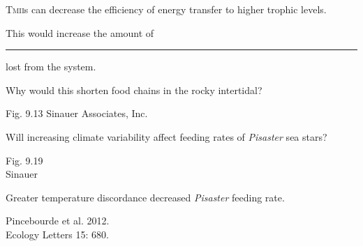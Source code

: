 \documentclass[t]{beamer}
\begin{document}
%
{
\begin{frame}[t]{\textsc{Tmii}s can decrease the efficiency of energy transfer to higher trophic levels.}

	\vspace*{2\baselineskip}

	\hspace*{75mm}\parbox{45mm}{\raggedright This would increase the amount of \rule{1.5cm}{0.4pt} lost from the system.}

	\vspace*{2\baselineskip}
	
	\hspace*{75mm}\parbox{45mm}{\raggedright Why would this shorten food chains in the rocky intertidal?}

	\vfilll
	
	\hfill \tiny Fig. 9.13 \textcopyright Sinauer Associates, Inc.
\end{frame}
}
%
{
\begin{frame}[b]{Will increasing climate variability affect feeding rates of \textit{Pisaster} sea stars?}

\hfill \tiny Fig. 9.19\\\hfill\textcopyright Sinauer
\end{frame}
}

%
{
\begin{frame}[b]{Greater temperature discordance decreased \textit{Pisaster} feeding rate.}

\tiny Pincebourde et al. 2012.\\
\tiny Ecology Letters 15: 680.
\end{frame}
}

%
\end{document}
